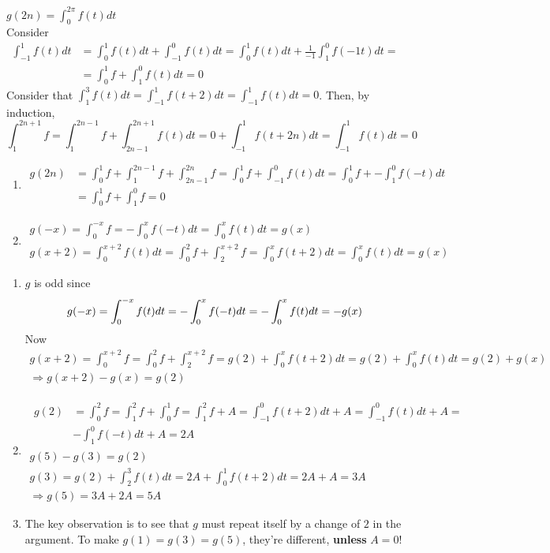 \documentclass[twoside]{amsart}
\theoremstyle{plain}
\theoremstyle{definition}
\newcommand{\exercisehead}[1]
  {\smallskip
   \noindent{\small\bf Exercise #1.}}
\begin{document}
\exercisehead{19} $g(2n) = \int_0^{2\pi} f(t)dt $ \\
Consider 
\[
\begin{aligned}
  \int_{-1}^1 f(t)dt & = \int_0^1 f(t) dt + \int_{-1}^0 f(t) dt = \int_0^1 f(t) dt + \frac{1}{-1} \int_1^0 f(-1 t) dt = \\
  & = \int_0^1 f + \int_1^0 f(t) dt = 0 
\end{aligned}
\]
Consider that $\int_1^3 f(t) dt = \int_{-1}^1 f(t+2)dt = \int_{-1}^1 f(t) dt =0$.  Then, by induction,
\[
\int_1^{2n+1} f = \int_1^{2n-1} f + \int_{2n-1}^{2n+1} f(t)dt = 0 + \int_{-1}^1 f(t +2n) dt = \int_{-1}^1 f(t)dt = 0
\]
\begin{enumerate}
\item \[
\begin{aligned}
  g(2n) & = \int_0^1 f + \int_1^{2n -1} f + \int_{2n-1}^{2n} f = \int_0^1 f + \int_{-1}^0 f(t) dt = \int_0^1 f + -\int_1^0 f(-t) dt \\
  & = \int_0^1 f + \int_1^0 f = 0 
\end{aligned}
\]
\item \[
\begin{gathered}
  g(-x) = \int_0^{-x} f = -\int_0^x f(-t)dt = \int_0^x f(t)dt = g(x) \\
  g(x+2) = \int_0^{x+2} f(t) dt = \int_0^2 f + \int_2^{x+2} f = \int_0^x f(t+2)dt = \int_0^x f(t) dt = g(x)
\end{gathered}
\]
\end{enumerate}

\exercisehead{20} \begin{enumerate}
\item $g$ is odd since \[
  g(-x) = \int_0^{-x} f(t) dt = -\int_0^x f(-t)dt = -\int_0^x f(t) dt = -g(x) \\
\]
Now
\[
\begin{gathered}
  g(x+2) = \int_0^{x+2} f = \int_0^2 f + \int_2^{x+2} f = g(2) + \int_0^x f(t+2) dt = g(2) + \int_0^x f(t)dt = g(2) + g(x) \\
  \Longrightarrow g(x+2) -g(x) = g(2)
\end{gathered}
\]
\item \[
\begin{gathered}
\begin{aligned}
  g(2) & = \int_0^2 f = \int_1^2 f + \int_0^1 f = \int_1^2 f + A = \int_{-1}^0 f(t+2)dt + A = \int_{-1}^0 f(t)dt + A = \\
  & - \int_1^0 f(-t)dt + A = 2A
\end{aligned} \\
g(5) - g(3) = g(2) \\
g(3) = g(2) + \int_2^3 f(t) dt = 2A + \int_0^1 f(t+2)dt = 2A + A = 3A  \\
\Longrightarrow g(5) = 3A + 2A = 5A 
\end{gathered}
\]
\item The key observation is to see that $g$ must repeat itself by a change of $2$ in the argument.  To make $g(1)=g(3)=g(5)$, they're different, \textbf{ unless} $A=0$!
\end{enumerate}
\end{document}
